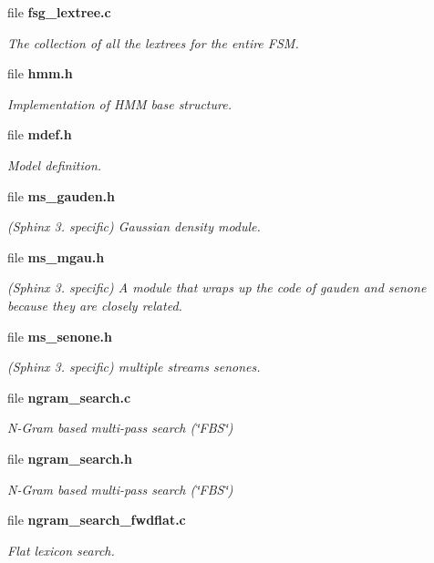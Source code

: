 \begin{DoxyCompactItemize}
file \textbf{ fsg\+\_\+lextree.\+c}
\begin{DoxyCompactList}\small\item\em The collection of all the lextrees for the entire F\+SM. \end{DoxyCompactList}\item 
file \textbf{ hmm.\+h}
\begin{DoxyCompactList}\small\item\em Implementation of H\+MM base structure. \end{DoxyCompactList}\item 
file \textbf{ mdef.\+h}
\begin{DoxyCompactList}\small\item\em Model definition. \end{DoxyCompactList}\item 
file \textbf{ ms\+\_\+gauden.\+h}
\begin{DoxyCompactList}\small\item\em (Sphinx 3. specific) Gaussian density module. \end{DoxyCompactList}\item 
file \textbf{ ms\+\_\+mgau.\+h}
\begin{DoxyCompactList}\small\item\em (Sphinx 3. specific) A module that wraps up the code of gauden and senone because they are closely related. \end{DoxyCompactList}\item 
file \textbf{ ms\+\_\+senone.\+h}
\begin{DoxyCompactList}\small\item\em (Sphinx 3. specific) multiple streams senones. \end{DoxyCompactList}\item 
file \textbf{ ngram\+\_\+search.\+c}
\begin{DoxyCompactList}\small\item\em N-\/\+Gram based multi-\/pass search (\char`\"{}\+F\+B\+S\char`\"{}) \end{DoxyCompactList}\item 
file \textbf{ ngram\+\_\+search.\+h}
\begin{DoxyCompactList}\small\item\em N-\/\+Gram based multi-\/pass search (\char`\"{}\+F\+B\+S\char`\"{}) \end{DoxyCompactList}\item 
file \textbf{ ngram\+\_\+search\+\_\+fwdflat.\+c}
\begin{DoxyCompactList}\small\item\em Flat lexicon search. \end{DoxyCompactList}\item 

\end{DoxyCompactItemize}
